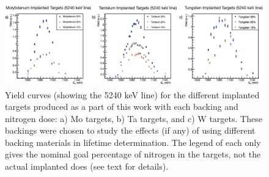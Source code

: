 \begin{landscape}
\begin{figure}
\centering
{}
\includegraphics[width=\linewidth]{figures/impComp.png}
\caption{Yield curves (showing the 5240 keV line) for the different implanted targets produced as a part of this work with each backing and nitrogen dose: a) Mo targets, b) Ta targets, and c) W targets. These backings were chosen to study the effects (if any) of using different backing materials in lifetime determination. The legend of each only gives the nominal goal percentage of nitrogen in the targets, not the actual implanted does (see text for details).}
\label{fig: yieldCurves}
\end{figure}
\end{landscape}


